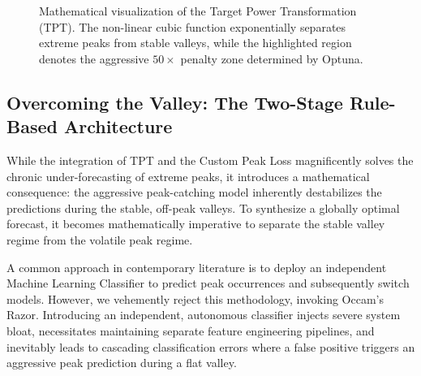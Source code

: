 \documentclass[pdflatex,sn-mathphys-num]{sn-jnl}%
\theoremstyle{thmstyleone}%
\theoremstyle{thmstyletwo}%
\theoremstyle{thmstylethree}%
\begin{document}
\begin{figure}[htbp]
\centering
{}
\caption{Mathematical visualization of the Target Power Transformation (TPT). The non-linear cubic function exponentially separates extreme peaks from stable valleys, while the highlighted region denotes the aggressive $50\times$ penalty zone determined by Optuna.}\label{fig:tpt_graph}
\end{figure}

\subsection{Overcoming the Valley: The Two-Stage Rule-Based Architecture}\label{subsec2_4}

While the integration of TPT and the Custom Peak Loss magnificently solves the chronic under-forecasting of extreme peaks, it introduces a mathematical consequence: the aggressive peak-catching model inherently destabilizes the predictions during the stable, off-peak valleys. To synthesize a globally optimal forecast, it becomes mathematically imperative to separate the stable valley regime from the volatile peak regime. 

A common approach in contemporary literature is to deploy an independent Machine Learning Classifier to predict peak occurrences and subsequently switch models. However, we vehemently reject this methodology, invoking Occam's Razor. Introducing an independent, autonomous classifier injects severe system bloat, necessitates maintaining separate feature engineering pipelines, and inevitably leads to cascading classification errors where a false positive triggers an aggressive peak prediction during a flat valley. 
\end{document}
